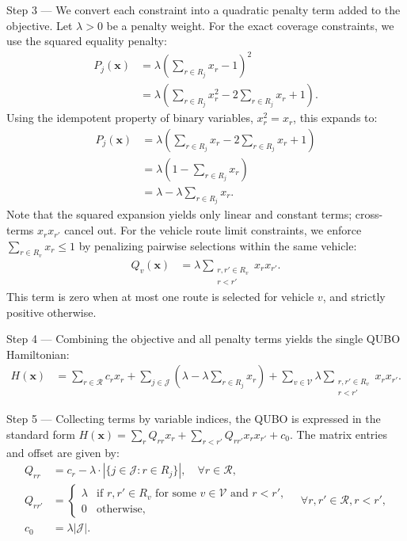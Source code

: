 \documentclass[12pt]{article}
\begin{document}
Step 3 --- We convert each constraint into a quadratic penalty term added to the objective. Let $\lambda > 0$ be a penalty weight.
For the exact coverage constraints, we use the squared equality penalty:
\begin{align}
    P_j(\mathbf{x}) &= \lambda \left( \sum_{r \in R_j} x_r - 1 \right)^2 \\
    &= \lambda \left( \sum_{r \in R_j} x_r^2 - 2 \sum_{r \in R_j} x_r + 1 \right).
\end{align}
Using the idempotent property of binary variables, $x_r^2 = x_r$, this expands to:
\begin{align}
    P_j(\mathbf{x}) &= \lambda \left( \sum_{r \in R_j} x_r - 2 \sum_{r \in R_j} x_r + 1 \right) \\
    &= \lambda \left( 1 - \sum_{r \in R_j} x_r \right) \\
    &= \lambda - \lambda \sum_{r \in R_j} x_r.
\end{align}
Note that the squared expansion yields only linear and constant terms; cross-terms $x_r x_{r'}$ cancel out.
For the vehicle route limit constraints, we enforce $\sum_{r \in R_v} x_r \le 1$ by penalizing pairwise selections within the same vehicle:
\begin{align}
    Q_v(\mathbf{x}) &= \lambda \sum_{\substack{r, r' \in R_v \\ r < r'}} x_r x_{r'}.
\end{align}
This term is zero when at most one route is selected for vehicle $v$, and strictly positive otherwise.

Step 4 --- Combining the objective and all penalty terms yields the single QUBO Hamiltonian:
\begin{align}
    H(\mathbf{x}) &= \sum_{r \in \mathcal{R}} c_r x_r + \sum_{j \in \mathcal{J}} \left( \lambda - \lambda \sum_{r \in R_j} x_r \right) + \sum_{v \in \mathcal{V}} \lambda \sum_{\substack{r, r' \in R_v \\ r < r'}} x_r x_{r'}.
\end{align}

Step 5 --- Collecting terms by variable indices, the QUBO is expressed in the standard form $H(\mathbf{x}) = \sum_{r} Q_{rr} x_r + \sum_{r < r'} Q_{rr'} x_r x_{r'} + c_0$. The matrix entries and offset are given by:
\begin{align}
    Q_{rr} &= c_r - \lambda \cdot |\{j \in \mathcal{J} : r \in R_j\}|, \quad \forall r \in \mathcal{R}, \\
    Q_{rr'} &= \begin{cases}
        \lambda & \text{if } r, r' \in R_v \text{ for some } v \in \mathcal{V} \text{ and } r < r', \\
        0 & \text{otherwise},
    \end{cases} \quad \forall r, r' \in \mathcal{R}, r < r', \\
    c_0 &= \lambda |\mathcal{J}|.
\end{align}
\end{document}
